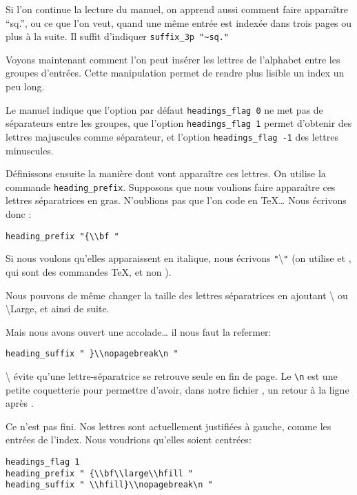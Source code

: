 Si l'on continue la lecture du manuel, on apprend aussi comment faire apparaître \enquote{sq.}, ou ce que l'on veut, quand une même entrée est indexée dans trois pages ou plus à la suite. Il suffit d'indiquer \verb+suffix_3p "~sq."+

Voyons maintenant comment l'on peut insérer les lettres de l'alphabet entre les groupes d'entrées. Cette manipulation permet de rendre plus lisible un index un peu long. 

Le manuel indique que l'option par défaut \verb+headings_flag 0+ ne met pas de séparateurs entre les groupes, que l'option \verb+headings_flag 1+ permet d'obtenir des lettres majuscules comme séparateur, et l'option  \verb+headings_flag -1+ des lettres minuscules.

Définissons ensuite la manière dont vont apparaître ces lettres. On utilise la commande \verb|heading_prefix|. Supposons que nous voulions faire apparaître ces lettres séparatrices en gras. N'oublions pas que l'on code en \TeX … Nous écrivons donc :

\begin{verbatim}
heading_prefix "{\\bf "
\end{verbatim} 

Si nous voulons qu'elles apparaissent en italique, nous écrivons \verb|"|\textbackslash{}\verb|"| (on utilise  et , qui sont des commandes \TeX, et non  ).

Nous  pouvons de même changer la taille des lettres séparatrices en ajoutant \textbackslash{} ou \cs\textbackslash{Large}, et ainsi de suite. 

Mais nous avons ouvert une accolade… il nous faut la refermer:

\begin{verbatim}
heading_suffix " }\\nopagebreak\n " 
\end{verbatim}

\textbackslash\cs{\nopagebreak} évite qu'une lettre-séparatrice se retrouve seule en fin de page. Le \verb|\n| est une petite coquetterie pour permettre d'avoir, dans notre fichier , un retour à la ligne après \cs{\nopagebreak}.



Ce n'est pas fini. Nos lettres sont actuellement justifiées à gauche, comme les entrées de l'index. Nous voudrions qu'elles soient centrées: 

\begin{verbatim}
headings_flag 1
heading_prefix " {\\bf\\large\\hfill " 
heading_suffix " \\hfill}\\nopagebreak\n " 
\end{verbatim}

